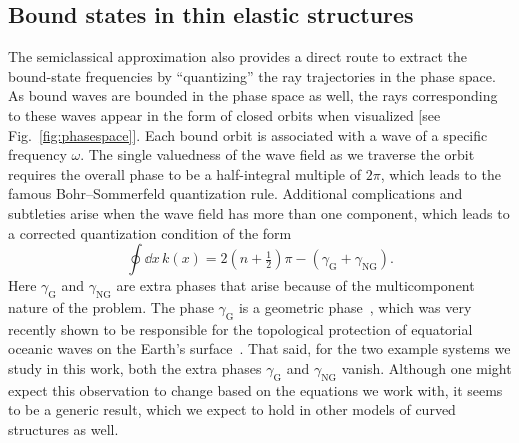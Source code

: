 \subsection{Bound states in thin elastic structures}

The semiclassical approximation also provides a direct route to extract the bound-state frequencies by ``quantizing'' the ray trajectories in the phase space.
As bound waves are bounded in the phase space as well, the rays corresponding to these waves appear in the form of closed orbits when visualized [see Fig.~\ref{fig:phasespace}].
Each bound orbit is associated with a wave of a specific frequency $\omega$.
The single valuedness of the wave field as we traverse the orbit requires the overall phase to be a half-integral multiple of $2\pi$, which leads to the famous Bohr--Sommerfeld quantization rule.
Additional complications and subtleties arise when the wave field has more than one component, which leads to a corrected quantization condition of the form
%
\begin{equation}
  \oint \dd{x}\,k(x) = 2\left(n + \tfrac{1}{2}\right)\pi - \left(\gamma_{\text{G}} + \gamma_{\text{NG}}\right).
\end{equation}
%
Here $\gamma_{\text{G}}$ and $\gamma_{\text{NG}}$ are extra phases that arise because of the multicomponent nature of the problem.
The phase $\gamma_{\text{G}}$ is a geometric phase~\cite{pancharatnam1956,berry1984}, which was very recently shown to be responsible for the topological protection of equatorial oceanic waves on the Earth's surface~\cite{venaille2023}.
That said, for the two example systems we study in this work, both the extra phases $\gamma_{\text{G}}$ and $\gamma_{\text{NG}}$ vanish.
Although one might expect this observation to change based on the equations we work with, it seems to be a generic result, which we expect to hold in other models of curved structures as well.

